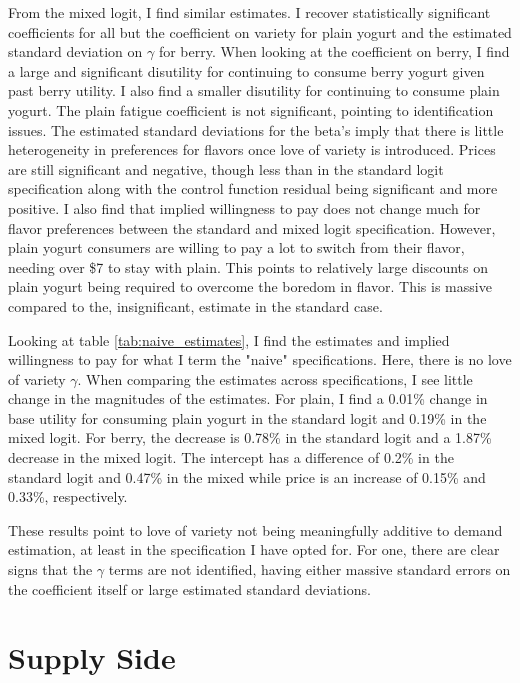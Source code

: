 \documentclass[11pt]{article}
\theoremstyle{definition}
\theoremstyle{remark}
\begin{document}
From the mixed logit, I find similar estimates. I recover statistically significant coefficients for all but the coefficient on variety for plain yogurt and the estimated standard deviation on $\gamma$ for berry. When looking at the coefficient on berry, I find a large and significant disutility for continuing to consume berry yogurt given past berry utility. I also find a smaller disutility for continuing to consume plain yogurt. The plain fatigue coefficient is not significant, pointing to identification issues. The estimated standard deviations for the beta's imply that there is little heterogeneity in preferences for flavors once love of variety is introduced. Prices are still significant and negative, though less than in the standard logit specification along with the control function residual being significant and more positive. I also find that implied willingness to pay does not change much for flavor preferences between the standard and mixed logit specification. However, plain yogurt consumers are willing to pay a lot to switch from their flavor, needing over \$7 to stay with plain. This points to relatively large discounts on plain yogurt being required to overcome the boredom in flavor. This is massive compared to the, insignificant, estimate in the standard case.

Looking at table \ref{tab:naive_estimates}, I find the estimates and implied willingness to pay for what I term the "naive" specifications. Here, there is no love of variety $\gamma$. When comparing the estimates across specifications, I see little change in the magnitudes of the estimates. For plain, I find a 0.01\% change in base utility for consuming plain yogurt in the standard logit and 0.19\% in the mixed logit. For berry, the decrease is 0.78\% in the standard logit and a 1.87\% decrease in the mixed logit. The intercept has a difference of 0.2\% in the standard logit and 0.47\% in the mixed while price is an increase of 0.15\% and 0.33\%, respectively. 

These results point to love of variety not being meaningfully additive to demand estimation, at least in the specification I have opted for. For one, there are clear signs that the $\gamma$ terms are not identified, having either massive standard errors on the coefficient itself or large estimated standard deviations. 

\section{Supply Side}
\end{document}
